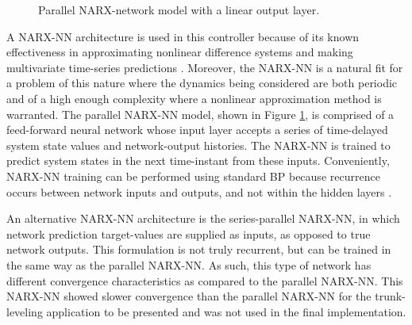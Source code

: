 			\begin{figure}[h!]
				\centering
				\caption{Parallel NARX-network model with a linear output layer.}
				\label{fig::narx_net}
			\end{figure}

		A NARX-NN architecture is used in this controller because of  its known effectiveness in approximating nonlinear difference systems and making multivariate time-series predictions \cite{Tsungnan1996,ChenBillings1990,Hihi1996,Billings2013}. Moreover, the NARX-NN is a natural fit for a problem of this nature where the dynamics being considered are both periodic and of a high enough complexity where a nonlinear approximation method is warranted. The parallel NARX-NN model, shown in Figure \ref{fig::narx_net}, is comprised of a feed-forward neural network whose input layer accepts a series of time-delayed system state values and network-output histories. The NARX-NN is trained to predict system states in the next time-instant from these inputs. Conveniently, NARX-NN training can be performed using standard BP because recurrence occurs between network inputs and outputs, and not within the hidden layers \cite{Nelles2001}. 

		An alternative NARX-NN architecture is the series-parallel NARX-NN, in which network prediction target-values are supplied as inputs, as opposed to true network outputs. This formulation is not truly recurrent, but can be trained in the same way as the parallel NARX-NN. As such, this type of network has different convergence characteristics as compared to the parallel NARX-NN. This NARX-NN showed slower convergence than the parallel NARX-NN for the trunk-leveling application to be presented and was not used in the final implementation.

